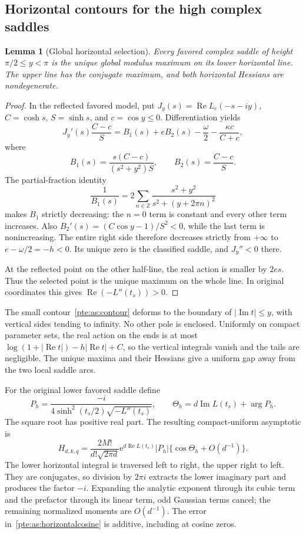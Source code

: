 \documentclass[11pt,a4paper]{article}
\numberwithin{equation}{section}
\newtheorem{lemma}[theorem]{Lemma}
\theoremstyle{definition}
\theoremstyle{plain}
\newcommand{\ee}{\mathrm e}
\begin{document}
\subsection{Horizontal contours for the high complex saddles}
\begin{lemma}[Global horizontal selection]\label{pte:as:horizontal}
Every favored complex saddle of height $\pi/2\le y<\pi$ is the unique global modulus maximum on its lower horizontal line. The upper line has the conjugate maximum, and both horizontal Hessians are nondegenerate.
\end{lemma}
\begin{proof}
In the reflected favored model, put $J_y(s)=\operatorname{Re}L_c(-s-iy)$, $C=\cosh s$, $S=\sinh s$, and $c=\cos y\le0$. Differentiation yields
\[
 J_y'(s)\frac{C-c}{S}
 =B_1(s)+eB_2(s)-\frac\omega2-\frac{\kappa c}{C+c},
\]
where
\[
 B_1(s)=\frac{s(C-c)}{(s^2+y^2)S},\qquad B_2(s)=\frac{C-c}{S}.
\]
The partial-fraction identity
\[
 \frac1{B_1(s)}=2\sum_{n\in\mathbb Z}
                  \frac{s^2+y^2}{s^2+(y+2\pi n)^2}
\]
makes $B_1$ strictly decreasing: the $n=0$ term is constant and every other term increases. Also $B_2'(s)=(C\cos y-1)/S^2<0$, while the last term is nonincreasing. The entire right side therefore decreases strictly from $+\infty$ to $e-\omega/2=-h<0$. Its unique zero is the classified saddle, and $J_y''<0$ there.

At the reflected point on the other half-line, the real action is smaller by $2es$. Thus the selected point is the unique maximum on the whole line. In original coordinates this gives $\operatorname{Re}(-L''(t_s))>0$.
\end{proof}

The small contour~\eqref{pte:as:contour} deforms to the boundary of $|\operatorname{Im}t|\le y$, with vertical sides tending to infinity. No other pole is enclosed. Uniformly on compact parameter sets, the real action on the ends is at most $\log(1+|\operatorname{Re}t|)-h|\operatorname{Re}t|+C$, so the vertical integrals vanish and the tails are negligible. The unique maxima and their Hessians give a uniform gap away from the two local saddle arcs.

For the original lower favored saddle define
\begin{equation}\label{pte:as:horizontalprefactor}
 P_h=\frac{-i}{4\sinh^2(t_s/2)\sqrt{-L''(t_s)}},\qquad
 \Theta_h=d\operatorname{Im}L(t_s)+\arg P_h.
\end{equation}
The square root has positive real part. The resulting compact-uniform asymptotic is
\begin{equation}\label{pte:as:horizontalcosine}
 H_{d,k,q}=\frac{2M!}{d!\sqrt{2\pi d}}
  \ee^{d\operatorname{Re}L(t_s)}|P_h|
  \{\cos\Theta_h+O(d^{-1})\}.
\end{equation}
The lower horizontal integral is traversed left to right, the upper right to left. They are conjugates, so division by $2\pi i$ extracts the lower imaginary part and produces the factor $-i$. Expanding the analytic exponent through its cubic term and the prefactor through its linear term, odd Gaussian terms cancel; the remaining normalized moments are $O(d^{-1})$. The error in~\eqref{pte:as:horizontalcosine} is additive, including at cosine zeros.
\end{document}
